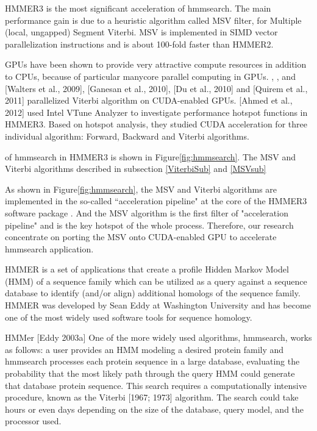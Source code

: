 HMMER3 \citep{HMMER3} is the most significant acceleration of hmmsearch. The main performance gain is due to a heuristic algorithm called MSV filter, for Multiple (local, ungapped) Segment Viterbi. MSV is implemented in SIMD vector parallelization instructions and is about 100-fold faster than HMMER2.

GPUs have been shown to provide very attractive compute resources in addition to CPUs, because of particular manycore parallel computing in GPUs.
\citep{GPUHMM}, \citep{Ganesan}, \citep{Du} and \citep{Quirem}
[Walters et al., 2009], [Ganesan et al., 2010], [Du et al., 2010] and [Quirem et al., 2011]
parallelized Viterbi algorithm on CUDA-enabled GPUs.
[Ahmed et al., 2012]\citep{Ahmed} used Intel VTune Analyzer \citep{Intel} to investigate performance hotspot functions in HMMER3. Based on hotspot analysis, they studied CUDA acceleration for three individual algorithm: Forward, Backward and Viterbi algorithms.

of hmmsearch in HMMER3 is shown in Figure\ref{fig:hmmsearch}. The MSV and Viterbi algorithms described in subsection \ref{ViterbiSub} and \ref{MSVsub}

As shown in Figure\ref{fig:hmmsearch}, the MSV and Viterbi algorithms are implemented in the so-called ``acceleration pipeline" at the core of the HMMER3 software package \citep{HMMER3}. And the MSV algorithm is the first filter of "acceleration pipeline" and is the key hotspot of the whole process. Therefore, our research concentrate on porting the MSV onto CUDA-enabled GPU to accelerate hmmsearch application.

HMMER \citep{HMMER} is a set of applications that create a profile Hidden Markov Model (HMM) of a sequence family which can be utilized as a query against a sequence database to identify (and/or align) additional homologs of the sequence family\citep{Seq}. HMMER was developed by Sean Eddy at Washington University and has become one of the most widely used software tools for sequence homology.

HMMer [Eddy 2003a]  One of the more widely used algorithms,
hmmsearch, works as follows: a user provides an
HMM modeling a desired protein family and hmmsearch
processes each protein sequence in a large database, evaluating
the probability that the most likely path through the
query HMM could generate that database protein sequence.
This search requires a computationally intensive procedure,
known as the Viterbi [1967; 1973] algorithm. The search
could take hours or even days depending on the size of the
database, query model, and the processor used.

